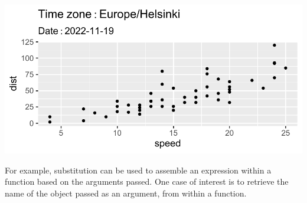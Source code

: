 \documentclass[krantz2]{krantz}\usepackage{knitr}
\begin{document}
\begin{knitrout}\footnotesize
{}\color{fgcolor}\begin{kframe}
\begin{alltt}
  \hlopt{+}
  \hlstd{()} \hlopt{+}
  \hlstd{(} \hlstd{=} \hlopt{~}\hlopt{:}  \hlstd{(} \hlstd{=} \hlstd{())),}
        \hlstd{=} \hlopt{:}  \hlstd{(} \hlstd{=} \hlstd{(}\hlstd{())))}
       \hlstd{)}
\end{alltt}
\end{kframe}

{\centering \includegraphics[width=.7\textwidth]{figure/pos-expr-substitute-01-1} 

}



\end{knitrout}

For example, substitution can be used to assemble an expression within a function based on the arguments passed. One case of interest is to retrieve the name of the object passed as an argument, from within a function.
\end{document}
